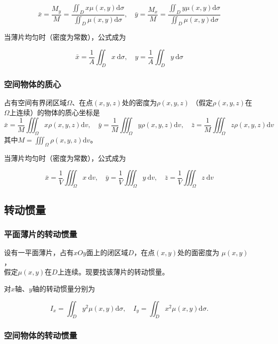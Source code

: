 \documentclass[12pt, a4paper]{article}
\numberwithin{equation}{section}
\begin{document}
    $$
        \bar{x}=\frac{M_y}{M}=\frac{\iint_D x \mu(x, y) \mathrm{d} \sigma}{\iint_D \mu(x, y) \mathrm{d} \sigma}, \quad
        \bar{y}=\frac{M_x}{M}=\frac{\iint_D y \mu(x, y) \mathrm{d} \sigma}{\iint_D \mu(x, y) \mathrm{d} \sigma}
    $$

    当薄片均匀时（密度为常数），公式成为

    $$
        \bar{x}=\frac{1}{A} \iint_D x \mathrm{~d} \sigma, \quad y=\frac{1}{A} \iint_D y \mathrm{~d} \sigma
    $$

\subsubsection{空间物体的质心}

    占有空间有界闭区域\(\varOmega\)、在点\(\left(x,y,z\right)\)处的密度为\(\rho\left(x,y,z\right)\)
    （假定\(\rho\left(x,y,z\right)\)在\(\varOmega\)上连续）的物体的质心坐标是
    \[\bar{x}=\frac{1}{M} \iiint_{\Omega} x \rho(x, y, z) \mathrm{d} v, \quad \bar{y}=\frac{1}{M} \iiint_{\Omega} y \rho(x, y, z) \mathrm{d} v,
    \quad \bar{z}=\frac{1}{M} \iiint_{\Omega} z \rho(x, y, z) \mathrm{d} v\]其中\(M = \iiint_\varOmega \rho(x, y, z) \mathrm{d} v\)。
    
    
    当薄片均匀时（密度为常数），公式成为

    $$
        \bar{x}=\frac{1}{V} \iiint_\varOmega x \mathrm{~d} v, \quad \bar{y}=\frac{1}{V} \iiint_\varOmega y \mathrm{~d} v, \quad \bar{z}=\frac{1}{V} \iiint_\varOmega z \mathrm{~d} v
    $$

\subsection{转动惯量}

\subsubsection{平面薄片的转动惯量}

    设有一平面薄片，占有\(xOy\)面上的闭区域\(D\)，在点\(\left(x,y\right)\)处的面密度为
    \(\mu\left(x,y\right)\)，\\假定\(\mu\left(x,y\right)\)在\(D\)上连续。现要找该薄片的转动惯量。

    对\(x\)轴、\(y\)轴的转动惯量分别为

    $$
        I_x=\iint_D y^2 \mu(x, y) \mathrm{d} \sigma, \quad I_y=\iint_D x^2 \mu(x, y) \mathrm{d} \sigma .
    $$

\subsubsection{空间物体的转动惯量}
\end{document}
